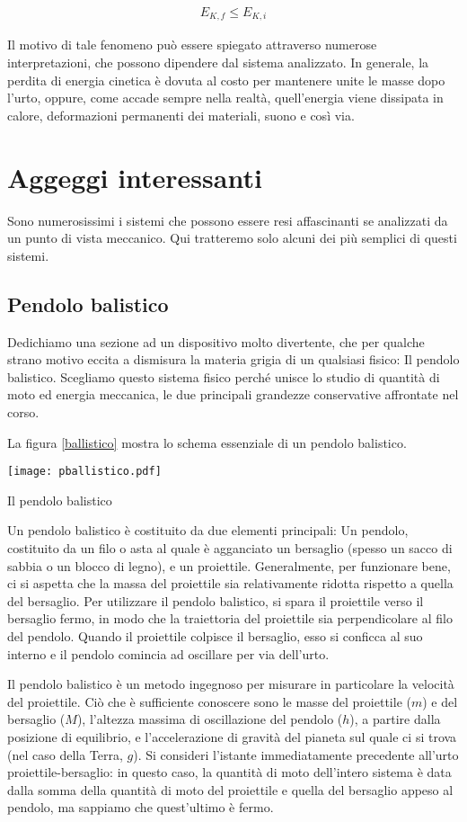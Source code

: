 \begin{align}
    E_{K,f} \leq E_{K,i}
\end{align}

\noindent Il motivo di tale fenomeno può essere spiegato attraverso numerose
interpretazioni, che possono dipendere dal sistema analizzato. In generale,
la perdita di energia cinetica è dovuta al costo per mantenere unite le
masse dopo l'urto, oppure, come accade sempre nella realtà, quell'energia
viene dissipata in calore, deformazioni permanenti dei materiali, suono e
così via.

\section{Aggeggi interessanti}
Sono numerosissimi i sistemi che possono essere resi affascinanti se
analizzati da un punto di vista meccanico. Qui tratteremo solo alcuni
dei più semplici di questi sistemi.

\subsection{Pendolo balistico}
Dedichiamo una sezione ad un dispositivo
molto divertente, che per qualche strano motivo eccita a dismisura la
materia grigia di un qualsiasi fisico: Il pendolo balistico. Scegliamo
questo sistema fisico perché unisce lo studio di quantità di moto ed
energia meccanica, le due principali grandezze conservative affrontate
nel corso.

La figura \ref{ballistico} mostra lo schema essenziale di un pendolo
balistico.
\begin{marginfigure}
    \centering
    \texttt{[image: pballistico.pdf]}
    \caption{Il pendolo balistico}
    \label{ballistico}
\end{marginfigure}
Un pendolo balistico è costituito da due elementi principali: Un
pendolo, costituito da un filo o asta al quale è agganciato un
bersaglio (spesso un sacco di sabbia o un blocco di legno),
e un proiettile. Generalmente, per funzionare bene, ci si aspetta
che la massa del proiettile sia relativamente ridotta rispetto a
quella del bersaglio. Per utilizzare il pendolo balistico, si
spara il proiettile verso il bersaglio fermo, in modo che la traiettoria
del proiettile sia perpendicolare al filo del pendolo. Quando il
proiettile colpisce il bersaglio, esso si conficca al suo interno
e il pendolo comincia ad oscillare per via dell'urto.

Il pendolo balistico è un metodo ingegnoso per misurare in
particolare la velocità del proiettile. Ciò che è sufficiente
conoscere sono le
masse del proiettile ($m$) e del bersaglio ($M$), l'altezza massima di
oscillazione del pendolo ($h$), a partire dalla posizione di equilibrio,
e l'accelerazione di gravità del pianeta
sul quale ci si trova (nel caso della Terra, $g$). Si consideri
l'istante immediatamente precedente all'urto proiettile-bersaglio:
in questo caso, la quantità di moto dell'intero sistema è data dalla
somma della quantità di moto del proiettile e quella del bersaglio
appeso al pendolo, ma sappiamo che quest'ultimo è fermo.


